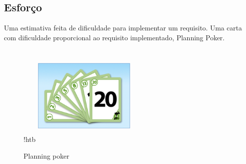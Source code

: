	\subsection{Esforço}
	Uma estimativa feita de dificuldade para implementar um requisito. Uma carta com dificuldade proporcional ao requisito implementado, Planning Poker.
	\begin{figure}{!htb}
  		\centering
		\includegraphics[height=5cm, width=5cm]{figuras/planning_poker.eps}
		\caption{Planning poker}
	\end{figure}

